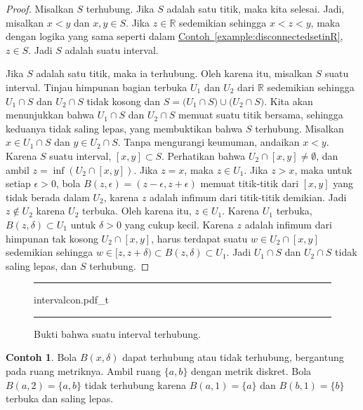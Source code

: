 \documentclass[12pt,openany]{book}
\newcommand{\R}{{\mathbb{R}}}
\theoremstyle{plain}
\theoremstyle{remark}
\theoremstyle{definition}
\newenvironment{myfig}{%
\begin{figure}[h!t]
\noindent\rule{\textwidth}{0.5pt}\vspace{12pt}\par\centering}%
{\par\noindent\rule{\textwidth}{0.5pt}
\end{figure}}
\theoremstyle{exercise}
\theoremstyle{example}
\newtheorem{example}[thm]{Contoh}
\newcommand{\exampleref}[1]{\hyperref[#1]{Contoh~\ref*{#1}}}
\begin{document}
\begin{proof}
Misalkan $S$ terhubung. Jika $S$ adalah satu titik,
maka kita selesai. Jadi, misalkan $x < y$ dan $x,y \in S$. Jika $z \in \R$ sedemikian
sehingga $x < z < y$, maka dengan logika yang sama seperti dalam
\exampleref{example:disconnectedsetinR}, $z \in S$.
Jadi $S$ adalah suatu interval.

Jika $S$ adalah satu titik, maka ia terhubung.
Oleh karena itu, misalkan $S$ suatu interval.
Tinjau himpunan bagian terbuka $U_1$ dan $U_2$ dari $\R$ sedemikian sehingga
$U_1 \cap S$ dan $U_2 \cap S$ tidak kosong dan
$S =
\bigl( U_1 \cap S \bigr)
\cup
\bigl( U_2 \cap S \bigr)$. Kita akan menunjukkan bahwa $U_1 \cap S$
dan $U_2 \cap S$ memuat suatu titik bersama, sehingga keduanya tidak saling lepas,
yang membuktikan bahwa $S$ terhubung.
Misalkan $x \in U_1 \cap S$
dan $y \in U_2 \cap S$. Tanpa mengurangi keumuman, andaikan $x < y$.
Karena $S$ suatu interval, $[x,y] \subset S$.
Perhatikan bahwa $U_2 \cap [x,y] \neq \emptyset$, dan
ambil $z = \inf (U_2 \cap [x,y])$.
Jika $z = x$, maka $z \in U_1$.
Jika $z > x$,
maka untuk setiap $\epsilon > 0$, bola $B(z,\epsilon) =
(z-\epsilon,z+\epsilon)$ memuat titik-titik dari $[x,y]$ yang tidak berada dalam $U_2$,
karena $z$ adalah infimum dari titik-titik demikian.
Jadi $z \notin U_2$ karena $U_2$ terbuka.
Oleh karena itu, $z \in U_1$. %
Karena $U_1$ terbuka,
$B(z,\delta) \subset U_1$ untuk $\delta > 0$ yang cukup kecil.
Karena $z$ adalah infimum dari himpunan tak kosong $U_2 \cap [x,y]$,
harus terdapat suatu $w \in U_2 \cap [x,y]$
sedemikian sehingga $w \in [z,z+\delta) \subset B(z,\delta) \subset U_1$.
Jadi $U_1 \cap S$ dan $U_2 \cap S$ tidak saling lepas, dan
$S$ terhubung.
\end{proof}

\begin{myfig}
{intervalcon.pdf_t}
\caption{Bukti bahwa suatu interval terhubung.\label{fig:intervalcon}}
\end{myfig}

\begin{example}
Bola $B(x,\delta)$ dapat terhubung atau tidak terhubung,
bergantung pada ruang metriknya.
Ambil ruang $\{ a, b\}$ dengan metrik diskret.
Bola $B(a,2) = \{ a , b \}$ tidak
terhubung karena $B(a,1) = \{ a \}$ dan
$B(b,1) = \{ b \}$ terbuka dan saling lepas.
\end{example}
\end{document}
